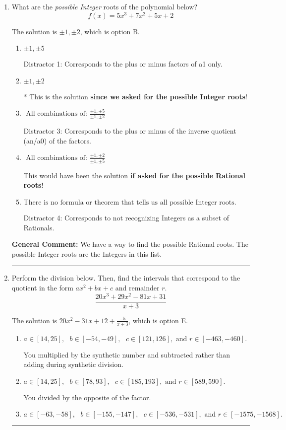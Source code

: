 \documentclass{extbook}[14pt]
\newcommand{\litem}[1]{\item #1

\rule{\textwidth}{0.4pt}}
\begin{document}
\begin{enumerate}\litem{
What are the \textit{possible Integer} roots of the polynomial below?
\[ f(x) = 5x^{3} +7 x^{2} +5 x + 2 \]

The solution is \( \pm 1,\pm 2 \), which is option B.\begin{enumerate}[label=\Alph*.]
\item \( \pm 1,\pm 5 \)

 Distractor 1: Corresponds to the plus or minus factors of a1 only.
\item \( \pm 1,\pm 2 \)

* This is the solution \textbf{since we asked for the possible Integer roots}!
\item \( \text{ All combinations of: }\frac{\pm 1,\pm 5}{\pm 1,\pm 2} \)

 Distractor 3: Corresponds to the plus or minus of the inverse quotient (an/a0) of the factors. 
\item \( \text{ All combinations of: }\frac{\pm 1,\pm 2}{\pm 1,\pm 5} \)

This would have been the solution \textbf{if asked for the possible Rational roots}!
\item \( \text{There is no formula or theorem that tells us all possible Integer roots.} \)

 Distractor 4: Corresponds to not recognizing Integers as a subset of Rationals.
\end{enumerate}

\textbf{General Comment:} We have a way to find the possible Rational roots. The possible Integer roots are the Integers in this list.
}
\litem{
Perform the division below. Then, find the intervals that correspond to the quotient in the form $ax^2+bx+c$ and remainder $r$.
\[ \frac{20x^{3} +29 x^{2} -81 x + 31}{x + 3} \]

The solution is \( 20x^{2} -31 x + 12 + \frac{-5}{x + 3} \), which is option E.\begin{enumerate}[label=\Alph*.]
\item \( a \in [14, 25], \text{   } b \in [-54, -49], \text{   } c \in [121, 126], \text{   and   } r \in [-463, -460]. \)

 You multiplied by the synthetic number and subtracted rather than adding during synthetic division.
\item \( a \in [14, 25], \text{   } b \in [78, 93], \text{   } c \in [185, 193], \text{   and   } r \in [589, 590]. \)

 You divided by the opposite of the factor.
\item \( a \in [-63, -58], \text{   } b \in [-155, -147], \text{   } c \in [-536, -531], \text{   and   } r \in [-1575, -1568]. \)


\end{enumerate}}
\end{enumerate}
\end{document}
